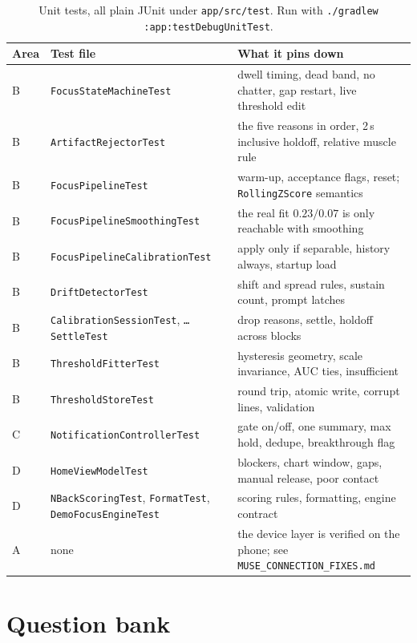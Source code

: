 \documentclass[10pt,a4paper]{article}
\newcommand{\file}[1]{\texttt{\small #1}}          %
\newcommand{\code}[1]{\texttt{#1}}                  %
\begin{document}
\begin{table}[htbp]\centering\small
\begin{tabularx}{\textwidth}{@{}l l X@{}}
\toprule
\textbf{Area} & \textbf{Test file} & \textbf{What it pins down} \\
\midrule
B & \file{FocusStateMachineTest} & dwell timing, dead band, no chatter, gap restart, live threshold edit \\
B & \file{ArtifactRejectorTest} & the five reasons in order, 2\,s inclusive holdoff, relative muscle rule \\
B & \file{FocusPipelineTest} & warm-up, acceptance flags, reset; \code{RollingZScore} semantics \\
B & \file{FocusPipelineSmoothingTest} & the real fit $0.23/0.07$ is only reachable with smoothing \\
B & \file{FocusPipelineCalibrationTest} & apply only if separable, history always, startup load \\
B & \file{DriftDetectorTest} & shift and spread rules, sustain count, prompt latches \\
B & \file{CalibrationSessionTest}, \file{\ldots SettleTest} & drop reasons, settle, holdoff across blocks \\
B & \file{ThresholdFitterTest} & hysteresis geometry, scale invariance, AUC ties, insufficient \\
B & \file{ThresholdStoreTest} & round trip, atomic write, corrupt lines, validation \\
C & \file{NotificationControllerTest} & gate on/off, one summary, max hold, dedupe, breakthrough flag \\
D & \file{HomeViewModelTest} & blockers, chart window, gaps, manual release, poor contact \\
D & \file{NBackScoringTest}, \file{FormatTest}, \file{DemoFocusEngineTest} & scoring rules, formatting, engine contract \\
A & none & the device layer is verified on the phone; see \file{MUSE\_CONNECTION\_FIXES.md} \\
\bottomrule
\end{tabularx}
\caption{Unit tests, all plain JUnit under \file{app/src/test}. Run with
\code{./gradlew :app:testDebugUnitTest}.}\label{tab:tests}
\end{table}
\section{Question bank}\label{sec:questions}
\end{document}
